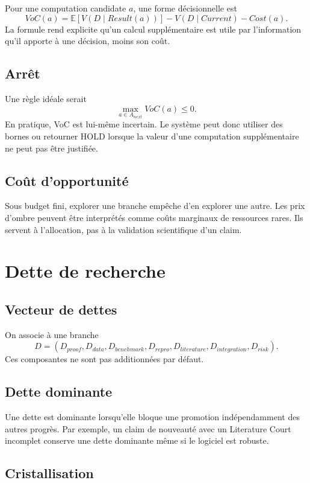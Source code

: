 Pour une computation candidate $a$, une forme décisionnelle est
\[
VoC(a)=\mathbb E[V(D\mid Result(a))]-V(D\mid Current)-Cost(a).
\]
La formule rend explicite qu'un calcul supplémentaire est utile par l'information qu'il apporte à une décision, moins son coût.

\section{Arrêt}

Une règle idéale serait
\[
\max_{a\in A_{next}}VoC(a)\leq0.
\]
En pratique, VoC est lui-même incertain. Le système peut donc utiliser des bornes ou retourner HOLD lorsque la valeur d'une computation supplémentaire ne peut pas être justifiée.

\section{Coût d'opportunité}

Sous budget fini, explorer une branche empêche d'en explorer une autre. Les prix d'ombre peuvent être interprétés comme coûts marginaux de ressources rares. Ils servent à l'allocation, pas à la validation scientifique d'un claim.

\chapter{Dette de recherche}

\section{Vecteur de dettes}

On associe à une branche
\[
D=(D_{proof},D_{data},D_{benchmark},D_{repro},D_{literature},D_{integration},D_{risk}).
\]
Ces composantes ne sont pas additionnées par défaut.

\section{Dette dominante}

Une dette est dominante lorsqu'elle bloque une promotion indépendamment des autres progrès. Par exemple, un claim de nouveauté avec un Literature Court incomplet conserve une dette dominante même si le logiciel est robuste.

\section{Cristallisation}

